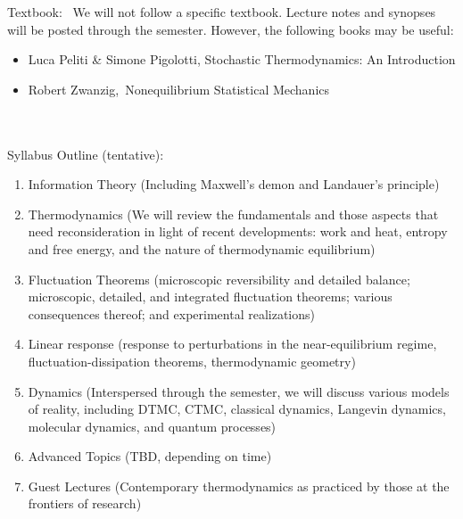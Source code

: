 \documentclass[article,notes]{bespoke6}
\begin{document}
Textbook:~
We will not follow a specific textbook. Lecture notes and synopses will be posted through the semester.
However, the following books may be useful:
\begin{itemize}
  \item Luca Peliti \& Simone Pigolotti, Stochastic Thermodynamics: An Introduction
  \item Robert Zwanzig, Nonequilibrium Statistical Mechanics
\end{itemize}
~\\~\\
Syllabus Outline (tentative):
\begin{enumerate}
  \item Information Theory (Including Maxwell's demon and Landauer's principle)
  \item Thermodynamics (We will review the fundamentals and those aspects that need reconsideration in light of recent developments: work and heat, entropy and free energy, and the nature of thermodynamic equilibrium) 
  \item Fluctuation Theorems (microscopic reversibility and detailed balance; microscopic, detailed, and integrated fluctuation theorems; various consequences thereof; and experimental realizations)
  \item Linear response (response to perturbations in the near-equilibrium regime, fluctuation-dissipation theorems, thermodynamic geometry)
  \item Dynamics (Interspersed through the semester, we will discuss various models of reality, including DTMC, CTMC, classical dynamics, Langevin dynamics, molecular dynamics, and quantum processes)
  \item Advanced Topics (TBD, depending on time)
  \item Guest Lectures (Contemporary thermodynamics as practiced by those at the frontiers of research)
\end{enumerate}

\newpage




%
%
%
\end{document}
